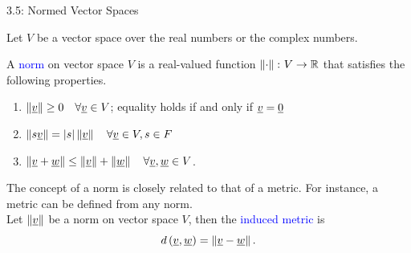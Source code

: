 \documentclass[10pt,letterpaper,english]{beamer}
\begin{document}
\begin{frame}{3.5: Normed Vector Spaces}

Let $V$ be a vector space over the real numbers or the complex numbers.

\begin{definition}
A \textcolor{blue}{norm} on vector space $V$ is a real-valued function $\left\| \cdot \right\| \colon V \rightarrow \mathbb{R}$ that satisfies the following properties.
\begin{enumerate}
\item $\left\| \underline{v} \right\| \geq 0 \quad \forall \underline{v} \in V$;
equality holds if and only if $\underline{v} = \underline{0}$
\item $\left\| s \underline{v} \right\| = |s| \left\| \underline{v} \right\| \quad \forall \underline{v} \in V, s \in F$
\item $\left\| \underline{v} + \underline{w} \right\| \leq
\left\| \underline{v} \right\| + \left\| \underline{w} \right\| \quad \forall \underline{v}, \underline{w} \in V$.
\end{enumerate}
\end{definition}

\vspace{3mm}

The concept of a norm is closely related to that of a metric.
For instance, a metric can be defined from any norm.\\[2mm]
Let $\left\| \underline{v} \right\|$ be a norm on vector space $V$, then the \textcolor{blue}{induced metric} is
\begin{equation*}
d \left( \underline{v}, \underline{w} \right)
= \left\| \underline{v} - \underline{w} \right\|.
\end{equation*}
\end{frame}
\end{document}
